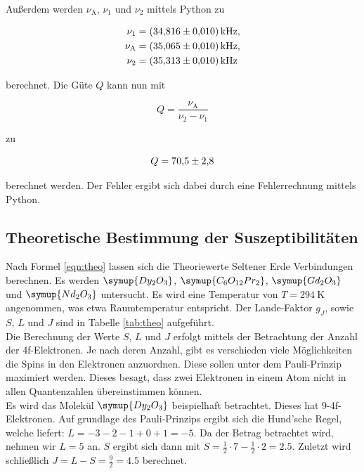Außerdem werden $\nu_\text{A}$, $\nu_1$ und $\nu_2$ mittels Python zu

\begin{align*}
\nu_1 &= \SI{34.816+-0.01}{\kilo\hertz},\\
\nu_\text{A} &= \SI{35.065+-0.01}{\kilo\hertz},\\
\nu_2 &= \SI{35.313+-0.01}{\kilo\hertz}
\end{align*}

berechnet. Die Güte $Q$ kann nun mit 

\begin{equation*}
Q = \frac{\nu_\text{A}}{\nu_2 - \nu_1}
\end{equation*}

zu 

\begin{equation*}
Q = \num{70.5+-2.8}
\end{equation*}

berechnet werden.
Der Fehler ergibt sich dabei durch eine Fehlerrechnung mittels 
Python.

\subsection{Theoretische Bestimmung der Suszeptibilitäten}

Nach Formel \eqref{eqn:theo} lassen sich die Theoriewerte Seltener 
Erde Verbindungen berechnen. Es werden $\symup{Dy_2O_3}$, $\symup{C_6O_{12}Pr_2}$, 
$\symup{Gd_2O_3}$ und $\symup{Nd_2O_3}$ untersucht. Es wird eine Temperatur von 
$T = \SI{294}{\kelvin}$ angenommen, was etwa Raumtemperatur entspricht.
Der Lande-Faktor $g_J$, sowie $S$, $L$ und $J$ sind in Tabelle \ref{tab:theo} 
aufgeführt.\\
Die Berechnung der Werte $S$, $L$ und $J$ erfolgt mittels der Betrachtung 
der Anzahl der 4f-Elektronen. Je nach deren Anzahl, gibt es verschieden 
viele Möglichkeiten die Spins in den Elektronen anzuordnen. Diese sollen
unter dem Pauli-Prinzip maximiert werden. Dieses besagt, dass zwei Elektronen
in einem Atom nicht in allen Quantenzahlen übereinstimmen können. \\
Es wird das Molekül $\symup{Dy_2O_3}$ beispielhaft betrachtet. Dieses hat 
$\num{9}$-4f-Elektronen. Auf grundlage des Pauli-Prinzips ergibt sich die 
Hund'sche Regel, welche liefert: $L = -3-2-1+0+1 = -5$. Da der Betrag betrachtet 
wird, nehmen wir $L = 5$ an. $S$ ergibt sich dann mit 
$S = \frac{1}{2}\cdot 7 - \frac{1}{2}\cdot 2 = \num{2.5}$. Zuletzt wird schließlich
$J= L - S = \frac{9}{2} = \num{4.5}$ berechnet. 

